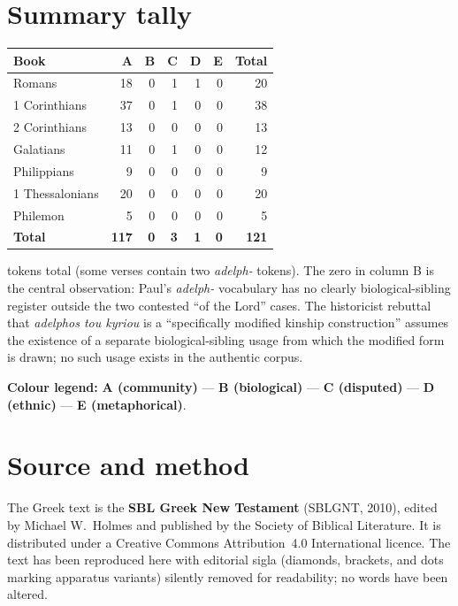 \documentclass[11pt,oneside]{article}
\newcommand{\adeA}[1]{\textcolor{colorA}{\textbf{#1}}}
\newcommand{\adeB}[1]{\textcolor{colorB}{\textbf{#1}}}
\newcommand{\adeC}[1]{\textcolor{colorC}{\textbf{#1}}}
\newcommand{\adeD}[1]{\textcolor{colorD}{\textbf{#1}}}
\newcommand{\adeE}[1]{\textcolor{colorE}{\textbf{#1}}}
\begin{document}
\section*{Summary tally}

\begin{center}
\begin{tabular}{lrrrrrr}
\toprule
Book & A & B & C & D & E & Total \\
\midrule
Romans           & 18 & 0 & 1 & 1 & 0 & 20 \\
1 Corinthians    & 37 & 0 & 1 & 0 & 0 & 38 \\
2 Corinthians    & 13 & 0 & 0 & 0 & 0 & 13 \\
Galatians        & 11 & 0 & 1 & 0 & 0 & 12 \\
Philippians      &  9 & 0 & 0 & 0 & 0 &  9 \\
1 Thessalonians  & 20 & 0 & 0 & 0 & 0 & 20 \\
Philemon         &  5 & 0 & 0 & 0 & 0 &  5 \\
\midrule
\textbf{Total}   & \textbf{117} & \textbf{0} & \textbf{3} & \textbf{1} & \textbf{0} & \textbf{121} \\
\bottomrule
\end{tabular}
\end{center}

 tokens total (some verses contain two \textit{adelph-} tokens).  The
zero in column B is the central observation: Paul's \textit{adelph-}
vocabulary has no clearly biological-sibling register outside the two
contested ``of the Lord'' cases.  The historicist rebuttal that
\textit{adelphos tou kyriou} is a ``specifically modified kinship
construction'' assumes the existence of a separate biological-sibling
usage from which the modified form is drawn; no such usage exists in
the authentic corpus.

\vspace{0.5em}
\noindent\textbf{Colour legend:} \adeA{A (community)} —
\adeB{B (biological)} — \adeC{C (disputed)} — \adeD{D (ethnic)} —
\adeE{E (metaphorical)}.

\section*{Source and method}

The Greek text is the \textbf{SBL Greek New Testament} (SBLGNT, 2010),
edited by Michael W.\ Holmes and published by the Society of Biblical
Literature.  It is distributed under a Creative Commons
Attribution~4.0 International licence.  The text has been reproduced
here with editorial sigla (diamonds, brackets, and dots marking
apparatus variants) silently removed for readability; no words have
been altered.
\end{document}
